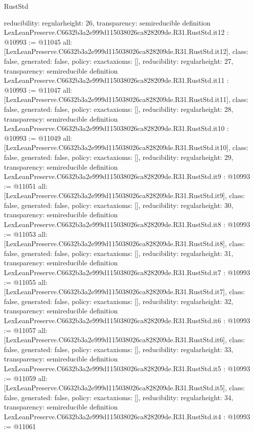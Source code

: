 \begin{lexlean}{RustStd}
\begin{coremodule}
{  reducibility: regular{height: 26},
  transparency: semireducible
}
definition LexLeanPreserve.C6632b3a2e999d115038026ca828209de.R31.RustStd.it12 : @10993 := @11045 {
  all: [LexLeanPreserve.C6632b3a2e999d115038026ca828209de.R31.RustStd.it12],
  class: false,
  generated: false,
  policy: exact{axioms: []},
  reducibility: regular{height: 27},
  transparency: semireducible
}
definition LexLeanPreserve.C6632b3a2e999d115038026ca828209de.R31.RustStd.it11 : @10993 := @11047 {
  all: [LexLeanPreserve.C6632b3a2e999d115038026ca828209de.R31.RustStd.it11],
  class: false,
  generated: false,
  policy: exact{axioms: []},
  reducibility: regular{height: 28},
  transparency: semireducible
}
definition LexLeanPreserve.C6632b3a2e999d115038026ca828209de.R31.RustStd.it10 : @10993 := @11049 {
  all: [LexLeanPreserve.C6632b3a2e999d115038026ca828209de.R31.RustStd.it10],
  class: false,
  generated: false,
  policy: exact{axioms: []},
  reducibility: regular{height: 29},
  transparency: semireducible
}
definition LexLeanPreserve.C6632b3a2e999d115038026ca828209de.R31.RustStd.it9 : @10993 := @11051 {
  all: [LexLeanPreserve.C6632b3a2e999d115038026ca828209de.R31.RustStd.it9],
  class: false,
  generated: false,
  policy: exact{axioms: []},
  reducibility: regular{height: 30},
  transparency: semireducible
}
definition LexLeanPreserve.C6632b3a2e999d115038026ca828209de.R31.RustStd.it8 : @10993 := @11053 {
  all: [LexLeanPreserve.C6632b3a2e999d115038026ca828209de.R31.RustStd.it8],
  class: false,
  generated: false,
  policy: exact{axioms: []},
  reducibility: regular{height: 31},
  transparency: semireducible
}
definition LexLeanPreserve.C6632b3a2e999d115038026ca828209de.R31.RustStd.it7 : @10993 := @11055 {
  all: [LexLeanPreserve.C6632b3a2e999d115038026ca828209de.R31.RustStd.it7],
  class: false,
  generated: false,
  policy: exact{axioms: []},
  reducibility: regular{height: 32},
  transparency: semireducible
}
definition LexLeanPreserve.C6632b3a2e999d115038026ca828209de.R31.RustStd.it6 : @10993 := @11057 {
  all: [LexLeanPreserve.C6632b3a2e999d115038026ca828209de.R31.RustStd.it6],
  class: false,
  generated: false,
  policy: exact{axioms: []},
  reducibility: regular{height: 33},
  transparency: semireducible
}
definition LexLeanPreserve.C6632b3a2e999d115038026ca828209de.R31.RustStd.it5 : @10993 := @11059 {
  all: [LexLeanPreserve.C6632b3a2e999d115038026ca828209de.R31.RustStd.it5],
  class: false,
  generated: false,
  policy: exact{axioms: []},
  reducibility: regular{height: 34},
  transparency: semireducible
}
definition LexLeanPreserve.C6632b3a2e999d115038026ca828209de.R31.RustStd.it4 : @10993 := @11061 {
}
\end{coremodule}
\end{lexlean}
